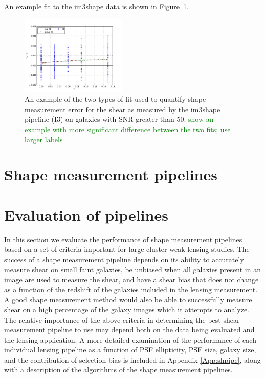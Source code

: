 \documentclass[useAMS,usenatbib]{mn2e}
\newcommand{\green}[1]{\textcolor{green}{#1}}
\begin{document}
An example fit to the im3shape data is shown in Figure~\ref{fig:eqfit}.

\begin{figure}
 \centering  %
  \includegraphics[width=0.45\textwidth]{fig/fitplt.pdf} 
  \caption{An example of the two types of fit used to quantify shape
    measurement error for the shear as measured by the im3shape
    pipeline (I3) on galaxies with SNR greater than 50. \green{show an example with more significant difference between the two fits; use larger labels} }
\label{fig:eqfit}
\end{figure}




\section{Shape measurement pipelines}




\section{Evaluation of pipelines}
In this section we evaluate the performance of shape measurement 
pipelines based on a set of criteria important for large cluster weak
lensing studies. The success of a shape measurement pipeline depends
on its ability to accurately measure shear on small faint galaxies, be unbiased
when all galaxies present in an image are used to measure the shear, and
have a shear bias that does not change as a function of the redshift
of the galaxies included in the lensing measurement. A good shape
measurement method would also be able to successfully measure shear on
a high percentage of the galaxy images which it attempts to analyze. 
The relative importance of the above criteria in determining
the best shear measurement pipeline to use may depend both on the 
data being evaluated and the lensing application. A more detailed examination
of the performance of each individual lensing pipeline 
as a function of PSF ellipticity, PSF size, galaxy size, 
and the contribution of selection bias is included in Appendix \ref{App:shpipe}, along
with a description of the algorithms of the shape measurement pipelines. \\
\end{document}
